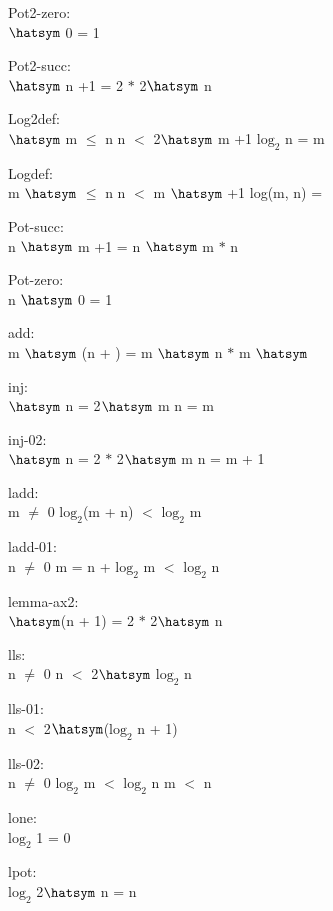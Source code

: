 \documentclass[a4paper]{article}
\begin{document}
\raggedright
              
Pot2-zero:\\ $\hatsym$ 0 = 1

Pot2-succ:\\ $\hatsym$ n +1 = 2 $*$ 2$\hatsym$ n

Log2def:\\ $\hatsym$ m $\le$ n \And n $<$ 2$\hatsym$ m +1 \Imp $\mbox{log}_{2}$ n = m

Logdef:\\ \Fol m $\hatsym$  $\le$ n \And n $<$ m $\hatsym$  +1 \Imp log(m, n) = 

Pot-succ:\\ \Fol n $\hatsym$ m +1 = n $\hatsym$ m $*$ n

Pot-zero:\\ \Fol n $\hatsym$ 0 = 1

add:\\ \Fol m $\hatsym$ (n + ) = m $\hatsym$ n $*$ m $\hatsym$ 

inj:\\ $\hatsym$ n = 2$\hatsym$ m \Equiv n = m

inj-02:\\ $\hatsym$ n = 2 $*$ 2$\hatsym$ m \Equiv n = m + 1

ladd:\\m $\neq$ 0 \Fol \Not $\mbox{log}_{2}$(m + n) $<$ $\mbox{log}_{2}$ m

ladd-01:\\n $\neq$ 0 \Fol m = n +  \Imp \Not $\mbox{log}_{2}$ m $<$ $\mbox{log}_{2}$ n

lemma-ax2:\\ $\hatsym$(n + 1) = 2 $*$ 2$\hatsym$ n

lls:\\ \Fol n $\neq$ 0 \Imp \Not n $<$ 2$\hatsym$ $\mbox{log}_{2}$ n

lls-01:\\ \Fol n $<$ 2$\hatsym$($\mbox{log}_{2}$ n + 1)

lls-02:\\n $\neq$ 0 \Fol $\mbox{log}_{2}$ m $<$ $\mbox{log}_{2}$ n \Imp m $<$ n

lone:\\ \Fol $\mbox{log}_{2}$ 1 = 0

lpot:\\ \Fol $\mbox{log}_{2}$ 2$\hatsym$ n = n
\end{document}
